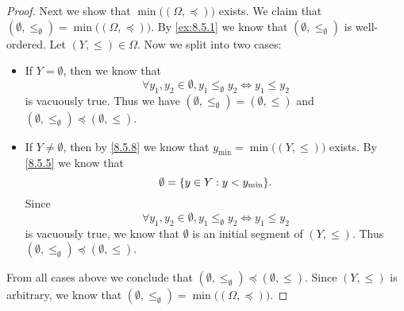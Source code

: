 \begin{proof}
  Next we show that \(\min\big((\Omega, \preceq)\big)\) exists.
  We claim that \((\emptyset, \leq_{\emptyset}) = \min\big((\Omega, \preceq)\big)\).
  By \cref{ex:8.5.1} we know that \((\emptyset, \leq_{\emptyset})\) is well-ordered.
  Let \((Y, \leq) \in \Omega\).
  Now we split into two cases:
  \begin{itemize}
    \item If \(Y = \emptyset\), then we know that
          \[
            \forall y_1, y_2 \in \emptyset, y_1 \leq_{\emptyset} y_2 \iff y_1 \leq y_2
          \]
          is vacuously true.
          Thus we have \((\emptyset, \leq_{\emptyset}) = (\emptyset, \leq)\) and \((\emptyset, \leq_{\emptyset}) \preceq (\emptyset, \leq)\).
    \item If \(Y \neq \emptyset\), then by \cref{8.5.8} we know that \(y_{\min} = \min\big((Y, \leq)\big)\) exists.
          By \cref{8.5.5} we know that
          \[
            \emptyset = \set{y \in Y : y < y_{\min}}.
          \]
          Since
          \[
            \forall y_1, y_2 \in \emptyset, y_1 \leq_{\emptyset} y_2 \iff y_1 \leq y_2
          \]
          is vacuously true, we know that \(\emptyset\) is an initial segment of \((Y, \leq)\).
          Thus \((\emptyset, \leq_{\emptyset}) \preceq (\emptyset, \leq)\).
  \end{itemize}
  From all cases above we conclude that \((\emptyset, \leq_{\emptyset}) \preceq (\emptyset, \leq)\).
  Since \((Y, \leq)\) is arbitrary, we know that \((\emptyset, \leq_{\emptyset}) = \min\big((\Omega, \preceq)\big)\).


\end{proof}
